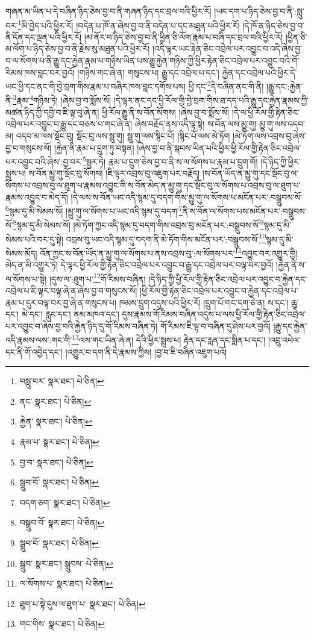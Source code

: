 གཞན་མ་ཡིན་པ་དེ་བཞིན་ཉིད་ཅེས་བྱ་བ་ནི་གཞན་ཉིད་དང་བྲལ་བའི་ཕྱིར་རོ། །ཡང་དག་པ་ཉིད་ཅེས་བྱ་བ་ནི་:སླུ་བར་\footnote{བསླུ་བར་  སྣར་ཐང་།  པེ་ཅིན། }མི་བྱེད་པའི་ཕྱིར་རོ། །བདེན་པ་ཁོ་ན་ཞེས་བྱ་བ་ནི་བདེན་པ་དང་མཐུན་པའི་ཕྱིར་རོ། །དེ་ཁོ་ན་ཉིད་ཅེས་བྱ་བ་ནི་དོན་དང་ལྡན་པའི་ཕྱིར་རོ། །མ་ནོར་བ་ཉིད་ཅེས་བྱ་བ་ནི་ཕྱིན་ཅི་ལོག་རྣམ་པ་བཞི་དང་བྲལ་བའི་ཕྱིར་རོ། །ཕྱིན་ཅི་མ་ལོག་པ་ཉིད་ཅེས་བྱ་བ་ནི་རྗེས་སུ་མཐུན་པའི་ཕྱིར་རོ། །འདི་ལྟར་ཡང་རྟེན་ཅིང་འབྲེལ་པར་འབྱུང་བ་འདི་ཞེས་བྱ་བ་ལ་སོགས་པ་ནི་རྒྱུ་དང་རྐྱེན་རྣམ་པ་གཉིས་ཡིན་པས་རྒྱུ་རྐྱེན་གཉིས་ཀྱི་ཕྱིར་རྟེན་ཅིང་འབྲེལ་པར་འབྱུང་བའི་གོ་རིམས་ཁས་བླང་བར་བྱའོ། །གཉིས་གང་ཞེ་ན། གསུངས་པ། རྒྱུ་དང་འབྲེལ་པ་དང་། རྐྱེན་དང་འབྲེལ་པའི་ཕྱིར་དེ་ཡང་ཕྱི་དང་ནང་གི་བྱེ་བྲག་གིས་རྣམ་པ་བཞིར་ཁས་བླང་དགོས་པས། ཕྱི་དང་\footnote{ནང་  སྣར་ཐང་།  པེ་ཅིན། }དེ་བཞིན་ནང་གི་ནི། །རྒྱུ་དང་:རྐྱེན་ནི་\footnote{རྐྱེན་  སྣར་ཐང་།  པེ་ཅིན། }རྣམ་\footnote{རྣམ་པ་  སྣར་ཐང་།  པེ་ཅིན། }གཉིས་ཏེ། །ཞེས་བྱ་བ་སྨོས་སོ། །དེ་ལྟར་ནང་དང་ཕྱི་རོལ་གྱི་བྱེ་བྲག་གིས་ཐ་དད་པའི་རྒྱུ་དང་རྐྱེན་རྣམས་ཀྱི་མཚན་ཉིད་ཀྱི་དབྱེ་བ་ཇི་ལྟ་བུ་ཞེ་ན། ཕྱི་རོལ་རྒྱུ་ནི་ས་བོན་སོགས། །ཞེས་བྱ་བ་སྨོས་སོ། །དེ་ལ་ཕྱི་རོལ་གྱི་རྟེན་ཅིང་འབྲེལ་པར་འབྱུང་བ་རྒྱུ་དང་བཅས་པ་གང་ཞེ་ན། ཞེས་བརྗོད་ནས་འདི་ལྟ་སྟེ། ས་བོན་ལས་མྱུ་གུ། མྱུ་གུ་ལས་འདབ་མ། འདབ་མ་ལས་སྡོང་བུ། སྡོང་བུ་ལས་སྦུ་གུ། སྦུ་གུ་ལས་སྙིང་པོ། །སྙིང་པོ་ལས་མེ་ཏོག །མེ་ཏོག་ལས་འབྲས་བུ་ཞེས་བྱ་བ་གསུངས་སོ། །རྐྱེན་ནི་རྣམ་པ་དྲུག་ཏུ་བསྟན། །ཞེས་བྱ་བ་ནི་སྐབས་ཡིན་པའི་ཕྱིར་ཕྱི་རོལ་གྱི་རྟེན་ཅིང་འབྲེལ་པར་འབྱུང་བའི་ཞེས་:བྱ་བར་\footnote{བྱ་བ་  སྣར་ཐང་།  པེ་ཅིན། }སྦྱར་ཏེ། རྣམ་པ་དྲུག་ཅེས་བྱ་བ་ནི་ས་ལ་སོགས་པ་རྣམ་པ་དྲུག་གོ། །དེ་ཉིད་ཀྱི་ཕྱིར་སྨྲས་པ། ས་བོན་མྱུ་གུ་སྡོང་བུ་སོགས། །ཇི་ལྟར་འབྲས་བུ་འཇུག་པར་བརྗོད། །ས་བོན་ཡོད་ན་མྱུ་གུ་དང་སྡོང་བུ་ལ་སོགས་པ་འབྲས་བུ་ལ་ཐུག་པ་རྣམས་འབྱུང་གི་ས་བོན་མེད་ན་མྱུ་གུ་དང་སྡོང་བུ་ལ་སོགས་པ་འབྲས་བུ་ལ་ཐུག་པ་རྣམས་འབྱུང་བ་མེད་དོ། །དེ་ལས་ས་བོན་ཡང་འདི་སྙམ་དུ་བདག་གིས་མྱུ་གུ་ལ་སོགས་པ་མངོན་པར་:བསྒྲུབས་སོ་\footnote{སྒྲུབ་བོ་  སྣར་ཐང་།  པེ་ཅིན། }སྙམ་དུ་མི་སེམས་སོ། །མྱུ་གུ་ལ་སོགས་པ་ཡང་འདི་སྙམ་དུ་བདག་\footnote{བདག་ཅག་  སྣར་ཐང་།  པེ་ཅིན། }ནི་ས་བོན་ལ་སོགས་པས་མངོན་པར་:བསྒྲུབས་སོ་\footnote{བསྒྲུབ་བོ་  སྣར་ཐང་།  པེ་ཅིན། }སྙམ་དུ་མི་སེམས་སོ། །མེ་ཏོག་ཀྱང་འདི་སྙམ་དུ་བདག་གིས་འབྲས་བུ་མངོན་པར་:བསྒྲུབས་སོ་\footnote{སྒྲུབ་བོ་  སྣར་ཐང་།  པེ་ཅིན། }སྙམ་དུ་མི་སེམས་པའི་བར་དུ་སྟེ། འབྲས་བུ་ཡང་འདི་སྙམ་དུ་བདག་ནི་མེ་ཏོག་གིས་མངོན་པར་:བསྒྲུབས་སོ་\footnote{སྒྲུབ་  སྣར་ཐང་། སྒྲུབས་  པེ་ཅིན། }སྙམ་དུ་མི་སེམས་མོད། འོན་ཀྱང་ས་བོན་ཡོད་ན་མྱུ་གུ་ལ་སོགས་པ་ནས་འབྲས་བུ་:ལ་སོགས་པར་\footnote{ལ་སོགས་པ་  སྣར་ཐང་།  པེ་ཅིན། }འབྱུང་བར་འགྱུར་གྱི། མེད་ན་མི་འགྱུར་ཏེ། དེ་ལྟར་ཕྱི་རོལ་གྱི་རྟེན་ཅིང་འབྲེལ་པར་འབྱུང་བ་རྒྱུ་དང་འབྲེལ་པར་བལྟ་བར་བྱའོ། །རྐྱེན་ནི་ས་ལ་སོགས་པ་སྟེ། །དུས་ལ་:ཐུག་པ་\footnote{ཐུག་པ་སྟེ་དུས་ལ་ཐུག་པ་  སྣར་ཐང་།  པེ་ཅིན། }གོ་རིམས་བཞིན། །དེ་ཉིད་ཀྱི་ཕྱི་རོལ་གྱི་རྟེན་ཅིང་འབྲེལ་པར་འབྱུང་བ་རྐྱེན་དང་འབྲེལ་པ་ཇི་ལྟར་བལྟ་ཞེ་ན་ཞེས་བྱ་བ་གསུངས་སོ། །ཕྱི་རོལ་གྱི་རྟེན་ཅིང་འབྲེལ་པར་འབྱུང་བ་རྐྱེན་དང་འབྲེལ་པ་རྣམ་པ་དུར་བལྟ་བར་བྱ་ཞེ་ན་གསུངས་པ། ཁམས་དྲུག་འདུས་པའི་ཕྱིར་རོ། །དྲུག་པོ་གང་དག་ཅེ་ན། ས་དང་། ཆུ་དང་། མེ་དང་། རླུང་དང་། ནམ་མཁའ་དང་། དུས་རྣམས་གོ་རིམས་བཞིན་འདུས་པ་ལས་ཕྱི་རོལ་གྱི་རྟེན་ཅིང་འབྲེལ་པར་འབྱུང་བ་ཞེས་བྱ་བའི་རྐྱེན་ཉིད་དུ་གོ་རིམས་བཞིན་ཏེ། གོ་རིམས་ཇི་ལྟ་བ་བཞིན་དུ་ཤེས་པར་བྱའོ། །རྒྱུ་དང་རྐྱེན་འདི་རྣམས་ལས་:གང་གི་\footnote{གང་གིས་  སྣར་ཐང་།  པེ་ཅིན། }ལས་གང་ཡིན་ཞེ་ན། དེའི་ཕྱིར་སྨྲས་པ། རྟེན་དང་རླན་དང་སྨིན་པ་དང་། །འབྲུ་འཕེལ་དང་ནི་གོ་འབྱེད་དང་། །འགྱུར་བ་དག་ནི་དེ་རྣམས་ཀྱིས། །བྱ་བ་ཇི་བཞིན་འཇུག་པའོ། 
